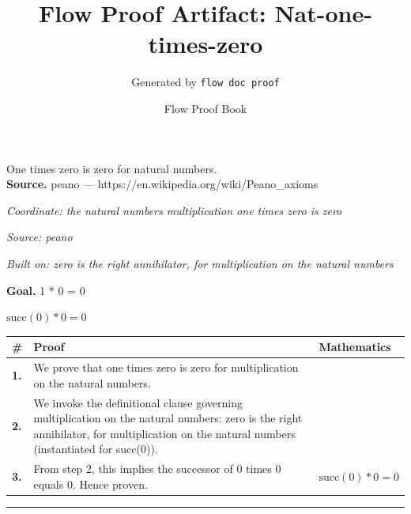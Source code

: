 \documentclass[11pt]{article}
\title{Flow Proof Artifact: Nat-one-times-zero}
\author{Generated by \texttt{flow doc proof}}
\date{Flow Proof Book}
\theoremstyle{definition}
\begin{document}
\maketitle
One times zero is zero for natural numbers.\\[0.5em]
\textbf{Source.} peano — https://en.wikipedia.org/wiki/Peano\_axioms\\[0.5em]
\bigskip
{}\par
\smallskip\noindent\textit{Coordinate: the natural numbers \cdot multiplication \cdot one times zero is zero}\par
\smallskip\noindent\textit{Source: peano}\par
\smallskip\noindent\textit{Built on: zero is the right annihilator, for multiplication on the natural numbers}\par
\medskip
\noindent\textbf{Goal.} 1 * 0 = 0\par
\noindent$\displaystyle \mathrm{succ}(0) * 0 = 0$\par
\medskip
\noindent
\begin{tabular}{@{} >{\raggedright\arraybackslash}p{} >{\raggedright\arraybackslash}p{} >{\raggedleft\arraybackslash}p{} @{}}
\textbf{\#} & \textbf{Proof} & \textbf{Mathematics} \\
\midrule
\textbf{1.} & We prove that one times zero is zero for multiplication on the natural numbers. & \\[0.45em]
\textbf{2.} & We invoke the definitional clause governing multiplication on the natural numbers: zero is the right annihilator, for multiplication on the natural numbers (instantiated for succ(0)). & \\[0.45em]
\textbf{3.} & From step 2, this implies the successor of 0 times 0 equals 0. Hence proven. & $\displaystyle \mathrm{succ}(0) * 0 = 0$ \\[0.45em]
\bottomrule
\end{tabular}
\label{thm:Nat-multiplication-one_times_zero_is_zero}
\par\medskip\hrule
\end{document}
